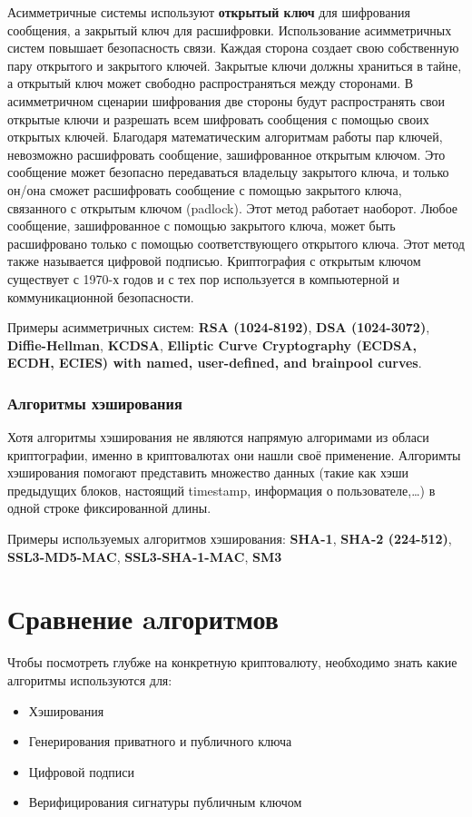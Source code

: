 \documentclass[russian, a4paper, 12pt]{article}
\begin{document}
Асимметричные системы используют \textbf{открытый ключ} для шифрования сообщения, а
закрытый ключ для расшифровки. Использование асимметричных систем повышает
безопасность связи. Каждая сторона создает свою
собственную пару открытого и закрытого ключей. Закрытые ключи должны храниться
в тайне, а открытый ключ может свободно распространяться между сторонами. В
асимметричном сценарии шифрования две стороны будут распространять свои
открытые ключи и разрешать всем шифровать сообщения с помощью своих открытых
ключей. Благодаря математическим алгоритмам работы пар ключей, невозможно
расшифровать сообщение, зашифрованное открытым ключом. Это сообщение может
безопасно передаваться владельцу закрытого ключа, и только он/она сможет
расшифровать сообщение с помощью закрытого ключа, связанного с открытым ключом
(padlock). Этот метод работает наоборот. Любое сообщение, зашифрованное с
помощью закрытого ключа, может быть расшифровано только с помощью
соответствующего открытого ключа. Этот метод также называется цифровой
подписью. Криптография с открытым ключом существует с 1970-х годов и с тех пор
используется в компьютерной и коммуникационной безопасности.

Примеры асимметричных систем: \textbf{RSA (1024-8192)}, \textbf{DSA
(1024-3072)}, \textbf{Diffie-Hellman}, \textbf{KCDSA}, \textbf{Elliptic Curve
Cryptography (ECDSA, ECDH, ECIES) with named, user-defined, and brainpool
curves}.

\subsubsection{Алгоритмы хэширования}
 Хотя алгоритмы хэширования не являются напрямую алгоримами из обласи
 криптографии, именно в криптовалютах они нашли своё применение. Алгоримты
 хэширования помогают представить множество данных (такие как хэши предыдущих
 блоков, настоящий timestamp, информация о пользователе,\dots) в одной строке
 фиксированной длины.

 Примеры используемых алгоритмов хэширования: \textbf{SHA-1}, \textbf{SHA-2
 (224-512)}, \textbf{SSL3-MD5-MAC}, \textbf{SSL3-SHA-1-MAC}, \textbf{SM3}

\section{Сравнение aлгоритмов}
Чтобы посмотреть глубже на конкретную криптовалюту, необходимо знать какие алгоритмы используются для:
\begin{itemize}
    \item Хэширования
    \item Генерирования приватного и публичного ключа
    \item Цифровой подписи
    \item Верифицирования сигнатуры публичным ключом
\end{itemize}
\end{document}
